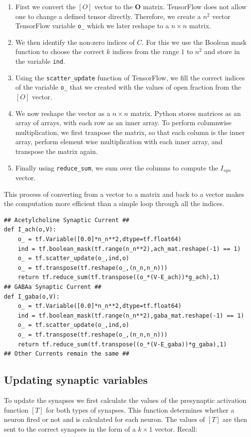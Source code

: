 \documentclass[10pt,letterpaper]{article}
\begin{document}
\begin{enumerate}
\item First we convert the $[O]$ vector to the $\mathbf{O}$ matrix. TensorFlow does not allow one to change a defined tensor directly. Therefore, we create a $n^{2}$ vector TensorFlow variable \texttt{o\_} which we later reshape to a $n\times n$ matrix.
\item We then identify the non-zero indices of $C$. For this we use the Boolean mask function to choose the correct $k$ indices from the range $1$ to $n^2$ and store in the variable \texttt{ind}.
\item Using the \texttt{scatter\_update} function of TensorFlow, we fill the correct indices of the variable \texttt{o\_} that we created with the values of open fraction from the $[O]$ vector.
\item We now reshape the vector as a $n\times n$ matrix. Python stores matrices as an array of arrays, with each row as an inner array. To perform columnwise multiplication, we first tranpose the matrix, so that each column is the inner array, perform element wise multiplication with each inner array, and transpose the matrix again.
\item Finally using \texttt{reduce\_sum}, we sum over the columns to compute the $I_{syn}$ vector.
\end{enumerate}
This process of converting from a vector to a matrix and back to a vector makes the computation more efficient than a simple loop through all the indices. 
\begin{verbatim}
## Acetylcholine Synaptic Current ##
def I_ach(o,V):
    o_ = tf.Variable([0.0]*n_n**2,dtype=tf.float64)
    ind = tf.boolean_mask(tf.range(n_n**2),ach_mat.reshape(-1) == 1)
    o_ = tf.scatter_update(o_,ind,o)
    o_ = tf.transpose(tf.reshape(o_,(n_n,n_n)))
    return tf.reduce_sum(tf.transpose((o_*(V-E_ach))*g_ach),1)
## GABAa Synaptic Current ##
def I_gaba(o,V):
    o_ = tf.Variable([0.0]*n_n**2,dtype=tf.float64)
    ind = tf.boolean_mask(tf.range(n_n**2),gaba_mat.reshape(-1) == 1)
    o_ = tf.scatter_update(o_,ind,o)
    o_ = tf.transpose(tf.reshape(o_,(n_n,n_n)))
    return tf.reduce_sum(tf.transpose((o_*(V-E_gaba))*g_gaba),1)
## Other Currents remain the same ##
\end{verbatim}

\subsection*{Updating synaptic variables}
To update the synapses we first calculate the values of the presynaptic activation function $[T]$ for both types of synapses. This function determines whether a neuron fired or not and is calculated for each neuron. The values of $[T]$ are then sent to the correct synapses in the form of a $k\times 1$ vector. Recall:
\end{document}
